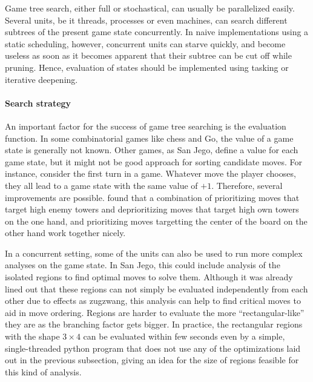 \documentclass[sigconf]{acmart}
\begin{document}
Game tree search, either full or stochastical, can usually be parallelized easily.
Several units, be it threads, processes or even machines, can search different subtrees of the present game state concurrently.
In naive implementations using a static scheduling, however, concurrent units can starve quickly, and become useless as soon as it becomes apparent that their subtree can be cut off while pruning.
Hence, evaluation of states should be implemented using tasking or iterative deepening.


\paragraph{Search strategy}
An important factor for the success of game tree searching is the evaluation function.
In some combinatorial games like chess and Go, the value of a game state is generally not known.
Other games, as San Jego, define a value for each game state, but it might not be good approach for sorting candidate moves.
For instance, consider the first turn in a game.
Whatever move the player chooses, they all lead to a game state with the same value of $+1$.
Therefore, several improvements are possible.
\citeauthor{Althöfer2020} found that a combination of prioritizing moves that target high enemy towers and deprioritizing moves that target high own towers on the one hand, and prioritizing moves targetting the center of the board on the other hand work together nicely.

In a concurrent setting, some of the units can also be used to run more complex analyses on the game state.
In San Jego, this could include analysis of the isolated regions to find optimal moves to solve them.
Although it was already lined out that these regions can not simply be evaluated independently from each other due to effects as zugzwang, this analysis can help to find critical moves to aid in move ordering.
Regions are harder to evaluate the more \enquote{rectangular-like} they are as the branching factor gets bigger.
In practice, the rectangular regions with the shape $3\times4$ can be evaluated within few seconds even by a simple, single-threaded python program that does not use any of the optimizations laid out in the previous subsection, giving an idea for the size of regions feasible for this kind of analysis.
\end{document}
